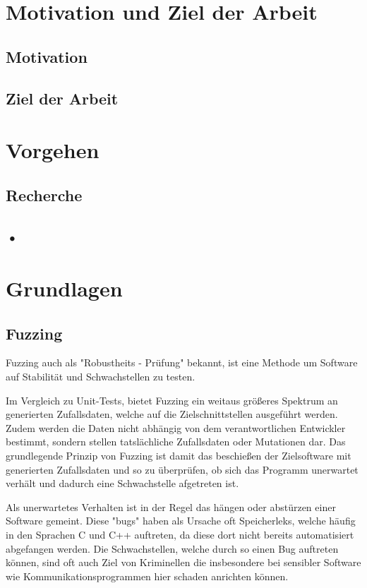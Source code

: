 \documentclass[12pt,a4paper]{scrreprt}
\begin{document}
\newpage
\chapter{ Motivation und Ziel der Arbeit  }

\section{Motivation}


\section{Ziel der Arbeit}


\chapter{Vorgehen}

\section{Recherche}

\section{•}


\newpage
\chapter{Grundlagen} 

\section{Fuzzing}
Fuzzing auch als "Robustheits - Prüfung" bekannt, ist eine Methode um Software auf Stabilität und Schwachstellen zu testen. 

Im Vergleich zu Unit-Tests, bietet Fuzzing ein weitaus größeres Spektrum an generierten Zufallsdaten, welche auf die Zielschnittstellen ausgeführt werden.
Zudem werden die Daten nicht abhängig von dem verantwortlichen Entwickler bestimmt, sondern stellen tatslächliche Zufallsdaten oder Mutationen dar. Das grundlegende Prinzip von Fuzzing ist damit das beschießen der Zielsoftware mit generierten Zufallsdaten und so zu überprüfen, ob sich das Programm unerwartet verhält und dadurch eine Schwachstelle afgetreten ist.

Als unerwartetes Verhalten ist in der Regel das hängen oder abstürzen einer Software gemeint. Diese "bugs" haben als Ursache oft Speicherleks, welche häufig in den Sprachen C und C++ auftreten, da diese dort nicht bereits automatisiert abgefangen werden. Die Schwachstellen, welche durch so einen Bug auftreten können, sind oft auch Ziel von Kriminellen die insbesondere bei sensibler Software wie Kommunikationsprogrammen hier schaden anrichten können.
\end{document}
